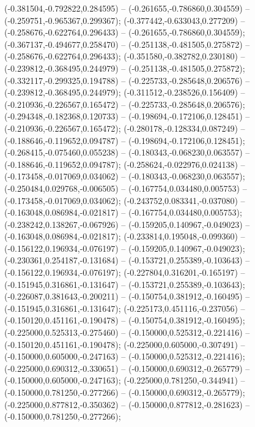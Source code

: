  (-0.381504,-0.792822,0.284595) -- (-0.261655,-0.786860,0.304559) -- (-0.259751,-0.965367,0.299367);
 (-0.377442,-0.633043,0.277209) -- (-0.258676,-0.622764,0.296433) -- (-0.261655,-0.786860,0.304559);
 (-0.367137,-0.494677,0.258470) -- (-0.251138,-0.481505,0.275872) -- (-0.258676,-0.622764,0.296433);
 (-0.351580,-0.382782,0.230180) -- (-0.239812,-0.368495,0.244979) -- (-0.251138,-0.481505,0.275872);
 (-0.332117,-0.299325,0.194788) -- (-0.225733,-0.285648,0.206576) -- (-0.239812,-0.368495,0.244979);
 (-0.311512,-0.238526,0.156409) -- (-0.210936,-0.226567,0.165472) -- (-0.225733,-0.285648,0.206576);
 (-0.294348,-0.182368,0.120733) -- (-0.198694,-0.172106,0.128451) -- (-0.210936,-0.226567,0.165472);
 (-0.280178,-0.128334,0.087249) -- (-0.188646,-0.119652,0.094787) -- (-0.198694,-0.172106,0.128451);
 (-0.268415,-0.075460,0.055238) -- (-0.180343,-0.068230,0.063557) -- (-0.188646,-0.119652,0.094787);
 (-0.258624,-0.022976,0.024138) -- (-0.173458,-0.017069,0.034062) -- (-0.180343,-0.068230,0.063557);
 (-0.250484,0.029768,-0.006505) -- (-0.167754,0.034480,0.005753) -- (-0.173458,-0.017069,0.034062);
 (-0.243752,0.083341,-0.037080) -- (-0.163048,0.086984,-0.021817) -- (-0.167754,0.034480,0.005753);
 (-0.238242,0.138267,-0.067926) -- (-0.159205,0.140967,-0.049023) -- (-0.163048,0.086984,-0.021817);
 (-0.233814,0.195048,-0.099360) -- (-0.156122,0.196934,-0.076197) -- (-0.159205,0.140967,-0.049023);
 (-0.230361,0.254187,-0.131684) -- (-0.153721,0.255389,-0.103643) -- (-0.156122,0.196934,-0.076197);
 (-0.227804,0.316201,-0.165197) -- (-0.151945,0.316861,-0.131647) -- (-0.153721,0.255389,-0.103643);
 (-0.226087,0.381643,-0.200211) -- (-0.150754,0.381912,-0.160495) -- (-0.151945,0.316861,-0.131647);
 (-0.225173,0.451116,-0.237056) -- (-0.150120,0.451161,-0.190478) -- (-0.150754,0.381912,-0.160495);
 (-0.225000,0.525313,-0.275460) -- (-0.150000,0.525312,-0.221416) -- (-0.150120,0.451161,-0.190478);
 (-0.225000,0.605000,-0.307491) -- (-0.150000,0.605000,-0.247163) -- (-0.150000,0.525312,-0.221416);
 (-0.225000,0.690312,-0.330651) -- (-0.150000,0.690312,-0.265779) -- (-0.150000,0.605000,-0.247163);
 (-0.225000,0.781250,-0.344941) -- (-0.150000,0.781250,-0.277266) -- (-0.150000,0.690312,-0.265779);
 (-0.225000,0.877812,-0.350362) -- (-0.150000,0.877812,-0.281623) -- (-0.150000,0.781250,-0.277266);
